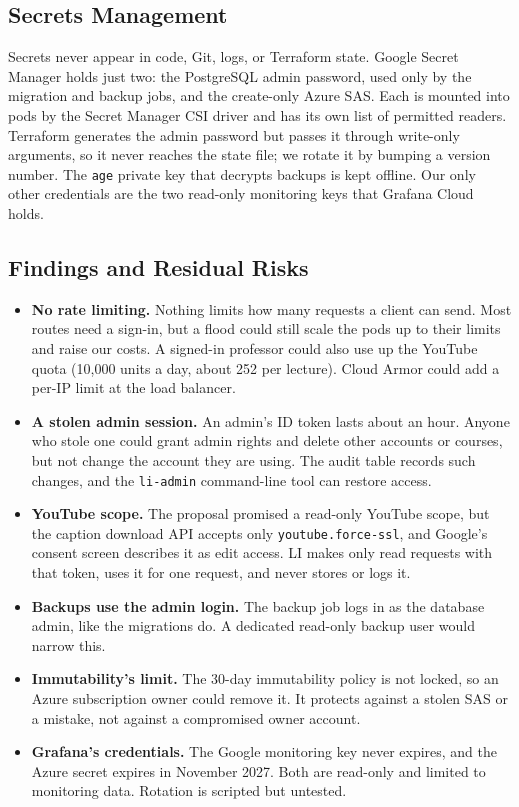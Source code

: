 \documentclass[conference]{IEEEtran}
\begin{document}
\subsection{Secrets Management}
Secrets never appear in code, Git, logs, or Terraform state. Google Secret
Manager holds just two: the PostgreSQL admin password, used only by the
migration and backup jobs, and the create-only Azure SAS. Each is mounted
into pods by the Secret Manager CSI driver and has its own list of
permitted readers. Terraform generates the admin password but passes it
through write-only arguments, so it never reaches the state file; we rotate
it by bumping a version number. The \texttt{age} private key that decrypts
backups is kept offline. Our only other credentials are the two read-only
monitoring keys that Grafana Cloud holds.

\subsection{Findings and Residual Risks}
\begin{itemize}
\item \textbf{No rate limiting.} Nothing limits how many requests a client
can send. Most routes need a sign-in, but a flood could still scale the
pods up to their limits and raise our costs. A signed-in professor could
also use up the YouTube quota (10,000 units a day, about 252 per lecture).
Cloud Armor could add a per-IP limit at the load balancer.
\item \textbf{A stolen admin session.} An admin's ID token lasts about an
hour. Anyone who stole one could grant admin rights and delete other
accounts or courses, but not change the account they are using. The audit
table records such changes, and the \texttt{li-admin} command-line tool
can restore access.
\item \textbf{YouTube scope.} The proposal promised a read-only YouTube
scope, but the caption download API accepts only
\texttt{youtube.force-ssl}, and Google's consent screen describes it as
edit access. LI makes only read requests with that token, uses it for one
request, and never stores or logs it.
\item \textbf{Backups use the admin login.} The backup job logs in as the
database admin, like the migrations do. A dedicated read-only backup user
would narrow this.
\item \textbf{Immutability's limit.} The 30-day immutability policy is not
locked, so an Azure subscription owner could remove it. It protects
against a stolen SAS or a mistake, not against a compromised owner
account.
\item \textbf{Grafana's credentials.} The Google monitoring key never
expires, and the Azure secret expires in November 2027. Both are read-only
and limited to monitoring data. Rotation is scripted but untested.
\end{itemize}
\end{document}
